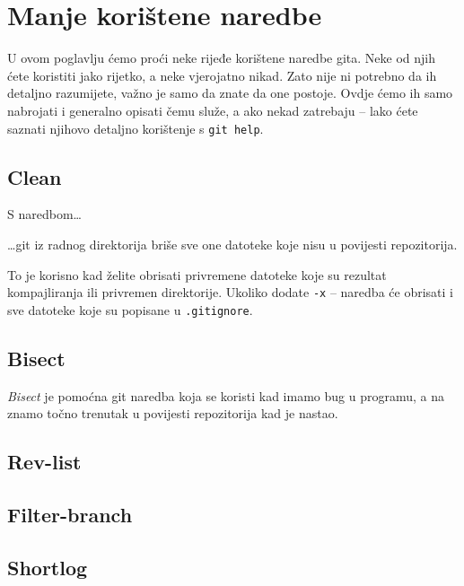 \chapter*{Manje korištene naredbe}

U ovom poglavlju ćemo proći neke rijeđe korištene naredbe gita.
Neke od njih ćete koristiti jako rijetko, a neke vjerojatno nikad.
Zato nije ni potrebno da ih detaljno razumijete, važno je samo da znate da one postoje. 
Ovdje ćemo ih samo nabrojati i generalno opisati čemu služe, a ako nekad zatrebaju -- lako ćete saznati njihovo detaljno korištenje s \verb+git help+.

\section*{Clean}

S naredbom\dots


\dots{}git iz radnog direktorija briše sve one datoteke koje nisu u povijesti repozitorija.

To je korisno kad želite obrisati privremene datoteke koje su rezultat kompajliranja ili privremen direktorije.
Ukoliko dodate \verb+-x+ -- naredba će obrisati i sve datoteke koje su popisane u \verb+.gitignore+.

\section*{Bisect}

\emph{Bisect} je pomoćna git naredba koja se koristi kad imamo bug u programu, a na znamo točno trenutak u povijesti repozitorija kad je nastao.

\TODO

\section*{Rev-list}

\TODO

\section*{Filter-branch}

\TODO

\section*{Shortlog}

